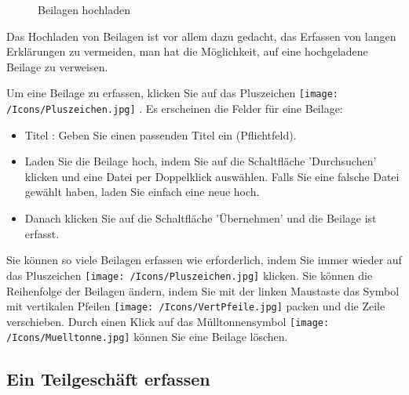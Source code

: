 \begin{figure}[H]
\caption{Beilagen hochladen}
\end{figure}

Das Hochladen von Beilagen ist vor allem dazu gedacht, das Erfassen von langen Erklärungen zu vermeiden, man hat die Möglichkeit, auf eine hochgeladene Beilage zu verweisen.

\vspace{\baselineskip}

Um eine Beilage zu erfassen, klicken Sie auf das Pluszeichen \texttt{[image: /Icons/Pluszeichen.jpg]} . Es erscheinen die Felder für eine Beilage:

\begin{itemize}
\item
Titel : Geben Sie einen passenden Titel ein (Pflichtfeld).
\item
Laden Sie die Beilage hoch, indem Sie auf die Schaltfläche 'Durchsuchen'  klicken und eine Datei per Doppelklick auswählen. Falls Sie eine falsche Datei gewählt haben, laden Sie einfach eine neue hoch.
\item
Danach klicken Sie auf die Schaltfläche 'Übernehmen'  und die Beilage ist erfasst.
\end{itemize}

Sie können so viele Beilagen erfassen wie erforderlich, indem Sie immer wieder auf das Pluszeichen \texttt{[image: /Icons/Pluszeichen.jpg]}  klicken. Sie können die Reihenfolge der Beilagen ändern, indem Sie mit der linken Maustaste das Symbol mit vertikalen Pfeilen \texttt{[image: /Icons/VertPfeile.jpg]}  packen und die Zeile verschieben. Durch einen Klick auf das Mülltonnensymbol \texttt{[image: /Icons/Muelltonne.jpg]}  können Sie eine Beilage löschen.


\subsection{Ein Teilgeschäft erfassen}


